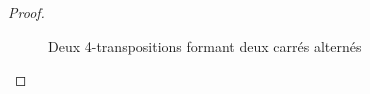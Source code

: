\begin{proof}
\begin{figure}[H]
\begin{center}
\begin{tikzpicture}
      \end{tikzpicture}
      \caption{Deux 4-transpositions formant deux carrés alternés}
    \end{center}
  \end{figure}



\end{proof}
